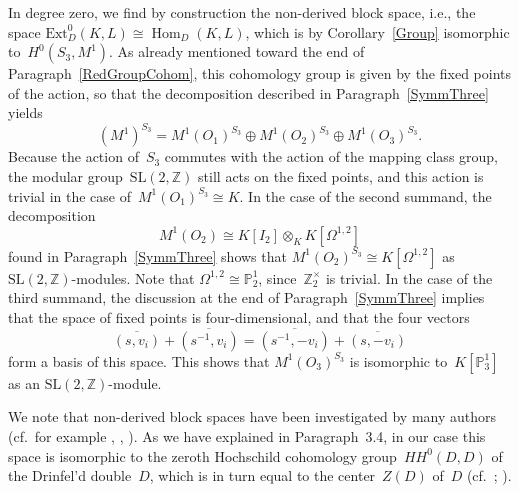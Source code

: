 \documentclass[12pt]{article}
\theoremstyle{definition}
\theoremstyle{break}
\newcommand{\Z}{\mathbb{Z}}
\DeclareMathOperator\Hom{Hom}
\newcommand{\SL}{\mathrm{SL}}
\renewcommand{\P}{\mathbb{P}}
\newcommand{\Ext}{\mathrm{Ext}}
\renewcommand{\1}{\mathbbm{1}}
\renewcommand{\P}{\mathbb{P}}
\begin{document}
In degree zero, we find by construction the non-derived block space, i.e., the space $\Ext_D^0(K, L) \cong \Hom_D(K, L)$, which is by Corollary~\ref{Group} isomorphic to~$H^0(S_3, M^1)$. As already mentioned toward the end of Paragraph~\ref{RedGroupCohom}, this cohomology group is given by the fixed points of the action, so that the decomposition described in Paragraph~\ref{SymmThree} yields
\[(M^1)^{S_3} = M^1(O_1)^{S_3} \oplus M^1(O_2)^{S_3} \oplus M^1(O_3)^{S_3}.\]
Because the action of~$S_3$ commutes with the action of the mapping class group, the modular group~$\SL(2,\Z)$ still acts on the fixed points, and this action is trivial in the case of~$M^1(O_1)^{S_3} \cong K$. In the case of the second summand, the decomposition
\[M^1(O_2) \cong K[I_2] \otimes_{K} K[\Omega^{1,2}]\]
found in Paragraph~\ref{SymmThree} shows that $M^1(O_2)^{S_3} \cong K[\Omega^{1,2}]$ as $\SL(2,\Z)$-modules.
Note that $\Omega^{1,2} \cong \P^1_2$, since~$\Z_2^\times$ is trivial. In the case of the third summand, the discussion at the end of Paragraph~\ref{SymmThree} implies that the space of fixed points is four-dimensional, and that the four vectors
\[\overline{(s,v_i)} + \overline{(s^{-1},v_i)} =
\overline{(s^{-1},-v_i)} + \overline{(s,-v_i)} \]
form a basis of this space. This shows that $M^1(O_3)^{S_3}$ is isomorphic to~$K[\P^1_3]$ as an $\SL(2,\Z)$-module.

We note that non-derived block spaces have been investigated by many authors (cf.~for example \cite{FF}, \cite{KSSB}, \cite{SZ}). As we have explained in Paragraph~3.4, in our case this space is isomorphic to the zeroth Hochschild cohomology group~$HH^0(D,D)$ of the Drinfel'd double~$D$, which is in turn equal to the center~$Z(D)$ of~$D$ (cf.~\cite[Sec.~1, Examp.~1.1, p.~403]{LMSS1}; \cite[Sec.~1.2, p.~10]{W2}).
\end{document}
